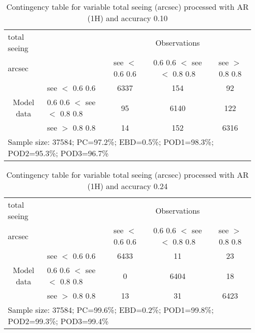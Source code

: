 \documentclass[11pt,english]{article}
\begin{document}
\begin{table}[]
\begin{center}
\begin{tabular}{llccc}
\hline
{total seeing}                                       &                                                    & \multicolumn{3}{c}{Observations}                 \\
{arcsec}                                       &                             & see $<$ 0.6
0.6   & 0.6
0.6 $<$ see $<$ 0.8
0.8 & see $>$ 0.8
0.8 \\
\hline
\multicolumn{1}{c}{\multirow{3}{*}{Model data}}  & see $<$ 0.6
0.6             & 6337                & 154                       & 92              \\
                                                 & 0.6
0.6  $<$ see $<$ 0.8
0.8 & 95                & 6140                       & 122              \\
                                                 & see $>$ 0.8
0.8             & 14                & 152                       & 6316              \\
\hline
\multicolumn{5}{l}{Sample size: 37584; PC=97.2\%; EBD=0.5\%; POD1=98.3\%; POD2=95.3\%; POD3=96.7\%}
\end{tabular}
\end{center}
\caption{Contingency table for variable total seeing (arcsec) processed with AR (1H) and accuracy 0.10}
\label{tab:contingencyseeAFT}
\end{table}
\begin{table}[]
\begin{center}
\begin{tabular}{llccc}
\hline
{total seeing}                                       &                                                    & \multicolumn{3}{c}{Observations}                 \\
{arcsec}                                       &                             & see $<$ 0.6
0.6   & 0.6
0.6 $<$ see $<$ 0.8
0.8 & see $>$ 0.8
0.8 \\
\hline
\multicolumn{1}{c}{\multirow{3}{*}{Model data}}  & see $<$ 0.6
0.6             & 6433                & 11                       & 23              \\
                                                 & 0.6
0.6  $<$ see $<$ 0.8
0.8 & 0                & 6404                       & 18              \\
                                                 & see $>$ 0.8
0.8             & 13                & 31                       & 6423              \\
\hline
\multicolumn{5}{l}{Sample size: 37584; PC=99.6\%; EBD=0.2\%; POD1=99.8\%; POD2=99.3\%; POD3=99.4\%}
\end{tabular}
\end{center}
\caption{Contingency table for variable total seeing (arcsec) processed with AR (1H) and accuracy 0.24}
\label{tab:contingencyseeAFT}
\end{table}
\end{document}
